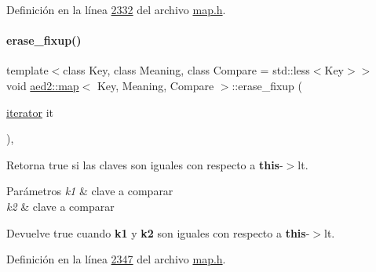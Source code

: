 Definición en la línea \hyperlink{map_8h_source_l02332}{2332} del archivo \hyperlink{map_8h_source}{map.\+h}.

\mbox{\label{classaed2_1_1map_a7870c8f26e82b00d0aeb2e9f331dfec6_a7870c8f26e82b00d0aeb2e9f331dfec6}} 
\paragraph{\texorpdfstring{erase\+\_\+fixup()}{erase\_fixup()}}
{\footnotesize\ttfamily template$<$class Key, class Meaning, class Compare = std\+::less$<$\+Key$>$$>$ \\
void \hyperlink{classaed2_1_1map}{aed2\+::map}$<$ Key, Meaning, Compare $>$\+::erase\+\_\+fixup (\begin{DoxyParamCaption}\item[{\hyperlink{classaed2_1_1map_1_1iterator}{iterator}}]{it }\end{DoxyParamCaption})\hspace{0.3cm}{\ttfamily [inline]}, {\ttfamily [private]}}



Retorna true si las claves son iguales con respecto a {\bfseries this}-\/$>$lt. 


\begin{DoxyParams}{Parámetros}
{\em k1} & clave a comparar \\
\hline
{\em k2} & clave a comparar \\
\hline
\end{DoxyParams}
\begin{DoxyReturn}{Devuelve}
true cuando {\bfseries k1} y {\bfseries k2} son iguales con respecto a {\bfseries this}-\/$>$lt. 
\end{DoxyReturn}


Definición en la línea \hyperlink{map_8h_source_l02347}{2347} del archivo \hyperlink{map_8h_source}{map.\+h}.

\mbox{\label{classaed2_1_1map_a0039f50bdf2b4e5836a1ad437ecb2202_a0039f50bdf2b4e5836a1ad437ecb2202}} 
